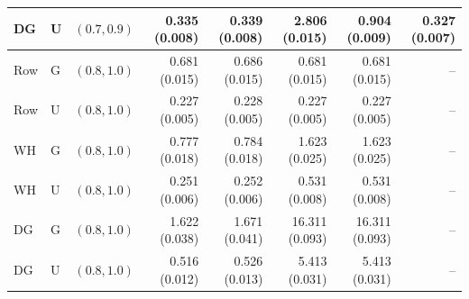 \begin{tabular}{@{}lllrrrrr@{}}
DG & U & $(0.7,0.9)$ & 0.335 (0.008) & 0.339 (0.008) & 2.806 (0.015) & 0.904 (0.009) & 0.327 (0.007) \\
\midrule
Row & G & $(0.8,1.0)$ & 0.681 (0.015) & 0.686 (0.015) & 0.681 (0.015) & 0.681 (0.015) & -- \\
Row & U & $(0.8,1.0)$ & 0.227 (0.005) & 0.228 (0.005) & 0.227 (0.005) & 0.227 (0.005) & -- \\
WH & G & $(0.8,1.0)$ & 0.777 (0.018) & 0.784 (0.018) & 1.623 (0.025) & 1.623 (0.025) & -- \\
WH & U & $(0.8,1.0)$ & 0.251 (0.006) & 0.252 (0.006) & 0.531 (0.008) & 0.531 (0.008) & -- \\
DG & G & $(0.8,1.0)$ & 1.622 (0.038) & 1.671 (0.041) & 16.311 (0.093) & 16.311 (0.093) & -- \\
DG & U & $(0.8,1.0)$ & 0.516 (0.012) & 0.526 (0.013) & 5.413 (0.031) & 5.413 (0.031) & -- \\
\bottomrule
\end{tabular}
